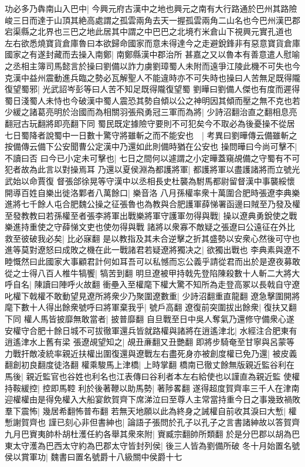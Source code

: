 功必多乃犇南山入巴中|{
	今興元府古漢中之地也興元之南有大行路通於巴州其路險峻三日而達于山頂其絶高處謂之孤雲兩角去天一握孤雲兩角二山名也今巴州漢巴郡宕渠縣之北界也三巴之地此居其中謂之中巴巴之北境冇米倉山下視興元實孔道也}
左右欲悉燒寶貨倉庫魯曰本欲歸命國家而意未得達今之走避銳鋒非有惡意寶貨倉庫國家之有遂封藏而去操入南鄭|{
	南鄭縣漢中郡治所}
甚嘉之又以魯本有善意遣人慰喻之丞相主簿司馬懿言於操曰劉備以詐力虜劉璋蜀人未附而遠爭江陵此機不可失也今克漢中益州震動進兵臨之勢必瓦解聖人不能違時亦不可失時也操曰人苦無足既得隴復望蜀邪|{
	光武詔岑彭等曰人苦不知足既得隴復望蜀}
劉曄曰劉備人傑也有度而遲得蜀日淺蜀人未恃也今破漢中蜀人震恐其勢自傾以公之神明因其傾而壓之無不克也若少緩之諸葛亮明於治國而為相關羽張飛勇冠三軍而為將|{
	少詩沼翻治直之翻相息亮翻冠古玩翻將即亮翻下同}
蜀民既定據險守要則不可犯矣今不取必為後憂操不從居七日蜀降者說蜀中一日數十驚守將雖斬之而不能安也　|{
	考異曰劉曄傳云備雖斬之按備傳云備下公安聞曹公定漢中乃還如此則備時猶在公安也}
操問曄曰今尚可擊不|{
	不讀曰否}
曰今已小定未可擊也|{
	七日之間何以遽謂之小定曄蓋窺覘備之守蜀有不可犯者故為此言以對操焉耳}
乃還以夏侯淵為都護將軍|{
	都護將軍以盡護諸將而立號光武始以命賈復}
督張郃徐晃等守漢中以丞相長史杜襲為駙馬都尉留督漢中事襲綏懷開導百姓自樂出徙洛鄴者八萬餘口|{
	樂音洛}
八月孫權率衆十萬圍合肥時張遼李典樂進將七千餘人屯合肥魏公操之征張魯也為教與合肥護軍薛悌署函邊曰賊至乃發及權至發教教曰若孫權至者張李將軍出戰樂將軍守護軍勿得與戰|{
	操以遼典勇銳使之戰樂進持重使之守薛悌文吏也使勿得與戰}
諸將以衆寡不敵疑之張遼曰公遠征在外比救至彼破我必矣|{
	比必寐翻}
是以教指及其未合逆擊之折其盛勢以安衆心然後可守也進等莫對遼怒曰成敗之機在此一戰諸君若疑遼將獨决之|{
	欲獨出戰也}
李典素與遼不睦慨然曰此國家大事顧君計何如耳吾可以私憾而忘公義乎請從君而出於是遼夜募敢從之士得八百人椎牛犒饗|{
	犒苦到翻}
明旦遼被甲持戟先登陷陳殺數十人斬二大將大呼自名|{
	陳讀曰陣呼火故翻}
衝壘入至權麾下權大驚不知所為走登高冢以長戟自守遼叱權下戟權不敢動望見遼所將衆少乃聚圍遼數重|{
	少詩沼翻重直龍翻}
遼急擊圍開將麾下數十人得出餘衆號呼曰將軍棄我乎|{
	號戶高翻}
遼復前突圍拔出餘衆|{
	復扶又翻下同}
權人馬皆披靡無敢當者|{
	披普靡翻}
自旦戰至日中吳人奪氣乃還修守備衆心遂安權守合肥十餘日城不可拔徹軍還兵皆就路權與諸將在逍遙津北|{
	水經注合肥東有逍遙津水上舊有梁}
張遼覘望知之|{
	覘丑亷翻又丑艷翻}
即將步騎奄至甘寧與呂蒙等力戰扞敵凌統率親近扶權出圍復還與遼戰左右盡死身亦被創度權已免乃還|{
	被皮義翻創初良翻度徒洛翻}
權乘駿馬上津橋|{
	上時掌翻}
橋南已徹丈餘無版親近監谷利在馬後|{
	親近監官也谷姓也利名也江表傳曰谷利者本左右給使也以謹直為親近監}
使權持鞍緩控|{
	控即馬鞚}
利於後著鞭以助馬勢|{
	著陟畧翻}
遂得超度賀齊率三千人在津南迎權權由是得免權入大船宴飲賀齊下席涕泣曰至尊人主常當持重今日之事幾致禍敗羣下震怖|{
	幾居希翻怖普布翻}
若無天地願以此為終身之誡權自前收其淚曰大慙|{
	權慙謝賀齊也}
謹已刻心非但書紳也|{
	論語子張問於孔子以孔子之言書諸紳故以答賀齊}
九月巴賨夷帥朴胡杜濩任約各舉其衆來附|{
	賨臧宗翻帥所類翻}
於是分巴郡以胡為巴東太守濩為巴西太守約為巴郡太守皆封列侯|{
	後三人皆為劉備所破}
冬十月始置名號侯以賞軍功|{
	魏書曰置名號爵十八級關中侯爵十七}


